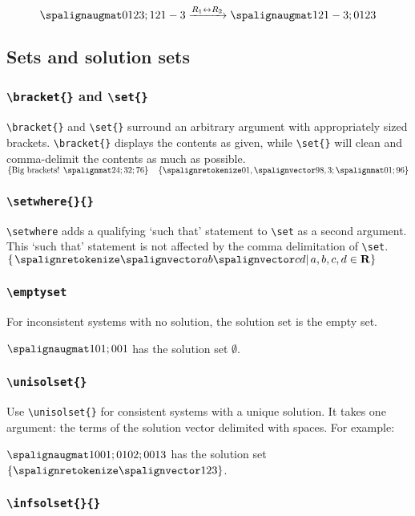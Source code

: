 \documentclass{article}
\begin{document}
\LTXexample[style=A]
\[\amat{0 1 2 3; 1 2 1 -3}
\rowswap{1}{2}
\amat{1 2 1 -3; 0 1 2 3}\]
\endLTXexample

\subsection{Sets and solution sets}

\subsubsection{\texttt{\textbackslash bracket\{\}} and \texttt{\textbackslash set\{\}}}
\verb=\bracket{}= and \verb=\set{}= surround an arbitrary argument with appropriately sized brackets. \verb=\bracket{}= displays the contents as given, while \verb=\set{}= will clean and comma-delimit the contents as much as possible.
\LTXexample[style=A]
$\bracket{\text{Big brackets! }\mat{2 4; 3 2; 7 6}} \quad
\set{0 1, \vct{9 8},3; \mat{0 1; 9 6}}$
\endLTXexample
\subsubsection{\texttt{\textbackslash setwhere\{\}\{\}}}
\verb=\setwhere= adds a qualifying `such that' statement to \verb=\set= as a second argument. This `such that' statement is not affected by the comma delimitation of \verb=\set=.
\LTXexample[style=A]
$\setwhere{\vct{a b} \vct{c d}}{a,b,c,d \in \mathbf{R}}$
\endLTXexample
\subsubsection{\texttt{\textbackslash emptyset}}
For inconsistent systems with no solution, the solution set is the empty set.

\LTXexample[style=A]
$\amat{1 0 1; 0 0 1}$ has the solution set     $\emptyset$.
\endLTXexample

\subsubsection{\texttt{\textbackslash unisolset\{\}}}

Use \verb=\unisolset{}= for consistent systems with a unique solution. It takes one argument: the terms of the solution vector delimited with spaces. For example:

\LTXexample[style=A]
$\amat{1 0 0 1; 0 1 0 2; 0 0 1 3}$ has the solution set $\unisolset{1 2 3}$.
\endLTXexample

\subsubsection{\texttt{\textbackslash infsolset\{\}\{\}}}
\end{document}
